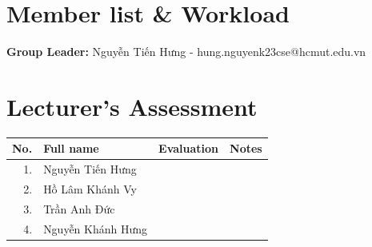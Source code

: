 \section*{Member list \& Workload}
\quad \textbf{Group Leader:} Nguyễn Tiến Hưng - hung.nguyenk23cse@hcmut.edu.vn

\contribution

\vspace{1cm}

\section*{Lecturer's Assessment}

\begingroup
    \renewcommand{\arraystretch}{1.5}
    \begin{center}
        \begin{tabularx}{\textwidth}{|r|l|>{\centering\arraybackslash}c|X|}
            \hline
            \textbf{No.} & \textbf{Full name} & \textbf{Evaluation} & \multicolumn{1}{c|}{\textbf{Notes}} \\
            \hline
            \hline
            1. & Nguyễn Tiến Hưng &  &  \\ \hline
            2. & Hồ Lâm Khánh Vy &  &  \\ \hline
            3. & Trần Anh Đức &  &  \\ \hline
            4. & Nguyễn Khánh Hưng &  &  \\ \hline
        \end{tabularx}
    \end{center}
\endgroup

